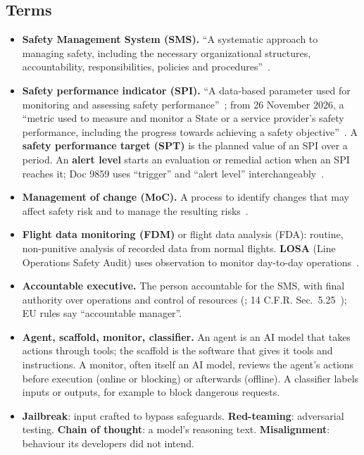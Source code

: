\documentclass[11pt]{article}
\begin{document}
\subsection{Terms}\label{sec:terms}

\begin{itemize}
\item \textbf{Safety Management System (SMS).} ``A systematic approach to managing safety, including the necessary organizational structures, accountability, responsibilities, policies and procedures''~\cite[Chapter~1]{icao2016annex19}.
\item \textbf{Safety performance indicator (SPI).} ``A data-based parameter used for monitoring and assessing safety performance''~\cite[Chapter~1]{icao2016annex19}; from 26 November 2026, a ``metric used to measure and monitor a State or a service provider's safety performance, including the progress towards achieving a safety objective''~\cite{icao2025amdt2}. A \textbf{safety performance target (SPT)} is the planned value of an SPI over a period. An \textbf{alert level} starts an evaluation or remedial action when an SPI reaches it; Doc 9859 uses ``trigger'' and ``alert level'' interchangeably~\cite[4.4.5, 9.5.4.15]{icao2018doc9859}.
\item \textbf{Management of change (MoC).} A process to identify changes that may affect safety risk and to manage the resulting risks~\cite[Appendix~2, 3.2]{icao2016annex19}.
\item \textbf{Flight data monitoring (FDM)} or flight data analysis (FDA): routine, non-punitive analysis of recorded data from normal flights. \textbf{LOSA} (Line Operations Safety Audit) uses observation to monitor day-to-day operations~\cite[9.4.4.1]{icao2018doc9859}.
\item \textbf{Accountable executive.} The person accountable for the SMS, with final authority over operations and control of resources (\cite[Appendix~2, 1.2]{icao2016annex19}; 14 C.F.R. Sec.~5.25~\cite{cfr14part5}); EU rules say ``accountable manager''.
\item \textbf{Agent, scaffold, monitor, classifier.} An agent is an AI model that takes actions through tools; the scaffold is the software that gives it tools and instructions. A monitor, often itself an AI model, reviews the agent's actions before execution (online or blocking) or afterwards (offline). A classifier labels inputs or outputs, for example to block dangerous requests.
\item \textbf{Jailbreak}: input crafted to bypass safeguards. \textbf{Red-teaming}: adversarial testing. \textbf{Chain of thought}: a model's reasoning text. \textbf{Misalignment}: behaviour its developers did not intend.
\end{itemize}
\end{document}
